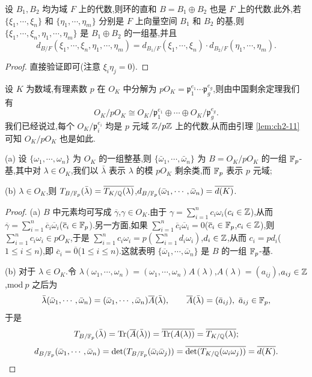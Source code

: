 \begin{lemma}\label{lem:ch2-11}
设 $B_1,B_2$ 均为域 $F$ 上的代数,则环的直和 $B=B_1\oplus B_2$ 也是 $F$ 上的代数.此外,若 $\{\xi_1,\cdots,\xi_n\}$ 和 $\{\eta_1,\cdots,\eta_m\}$ 分别是 $F$ 上向量空间 $B_1$ 和 $B_2$ 的基,则 $\{\xi_1,\cdots,\xi_n,\eta_1,\cdots,\eta_m\}$ 是 $B_1\oplus B_2$ 的一组基,并且
\begin{equation}  d_{B/F}(\xi_1,\cdots,\xi_n,\eta_1,\cdots,\eta_m)
  =d_{B_1/F}(\xi_1,\cdots,\xi_n)\cdot d_{B_2/F}(\eta_1,\cdots,\eta_m).\tag{2}\end{equation}
\end{lemma}

\begin{proof}
直接验证即可(注意 $\xi_i\eta_j=0$).
\end{proof}

设 $K$ 为数域,有理素数 $p$ 在 $O_K$ 中分解为 $pO_K=\mathfrak{p}_1^{e_1}\cdots\mathfrak{p}_g^{e_g}$,则由中国剩余定理我们有
\[
  O_K/pO_K\cong O_K/\mathfrak{p}_1^{e_1}\oplus\cdots\oplus O_K/\mathfrak{p}_g^{e_g}.
\]
我们已经说过,每个 $O_K/\mathfrak{p}_i^{e_i}$ 均是 $p$ 元域 $\mathbb{Z}/p\mathbb{Z}$ 上的代数,从而由引理 \ref{lem:ch2-11} 可知 $O_K/pO_K$ 也是如此.

\begin{lemma}\label{lem:ch2-12}
(a) 设 $\{\omega_1,\cdots,\omega_n\}$ 为 $O_K$ 的一组整基,则 $\{\bar{\omega}_1,\cdots,\bar{\omega}_n\}$ 为 $B=O_K/pO_K$ 的一组 $\mathbb{F}_p$-基,其中对 $\lambda\in O_K$,我们以 $\bar{\lambda}$ 表示 $\lambda$ 的模 $pO_K$ 剩余类,而 $\mathbb{F}_p$ 表示 $p$ 元域;

(b) $\lambda\in O_K$,则 $T_{B/\mathbb{F}_p}(\bar{\lambda})=\overline{T_{K/\mathbb{Q}}(\lambda)}$,$d_{B/\mathbb{F}_p}(\bar{\omega}_1,\cdots,\bar{\omega}_n)=\overline{d(K)}$.
\end{lemma}

\begin{proof}
(a) $B$ 中元素均可写成 $\overline{\gamma}$,$\gamma\in O_K$.由于 $\gamma=\sum_{i=1}^{n}c_i\omega_i$($c_i\in\mathbb{Z}$),从而 $\overline{\gamma}=\sum_{i=1}^{n}\overline{c}_i\overline{\omega}_i$($\overline{c}_i\in\mathbb{F}_p$).另一方面,如果 $\sum_{i=1}^{n}\overline{c}_i\overline{\omega}_i=0$($\overline{c}_i\in\mathbb{F}_p$,$c_i\in\mathbb{Z}$),则 $\sum_{i=1}^{n}c_i\omega_i\in pO_K$,于是 $\sum_{i=1}^{n}c_i\omega_i=p(\sum_{i=1}^{n}d_i\omega_i)$,$d_i\in\mathbb{Z}$,从而 $c_i=pd_i$($1\leqslant i\leqslant n$),即 $\overline{c}_i=\overline{0}$($1\leqslant i\leqslant n$).这就表明 $\{\overline{\omega}_1,\cdots,\overline{\omega}_n\}$ 是 $B$ 的一组 $\mathbb{F}_p$-基.

(b) 对于 $\lambda\in O_K$.令 $\lambda(\omega_1,\cdots,\omega_n)=(\omega_1,\cdots,\omega_n)A(\lambda)$,$A(\lambda)=(a_{ij})$,$a_{ij}\in\mathbb{Z}$,$\mathrm{mod}\ p$ 之后为
\[
  \bar{\lambda}(\bar{\omega}_1,\cdots,\bar{\omega}_n)=(\bar{\omega}_1,\cdots,\bar{\omega}_n)\overline{A}(\bar{\lambda}),
  \qquad \overline{A}(\bar{\lambda})=(\bar{a}_{ij}),\ \bar{a}_{ij}\in\F_p,
\]
于是
\[
  T_{B/\mathbb{F}_p}(\bar{\lambda})=\mathrm{Tr}(\overline{A}(\bar{\lambda}))=\overline{\mathrm{Tr}(A(\lambda))}=\overline{T_{K/\mathbb{Q}}(\lambda)};
\]
\[
  d_{B/\mathbb{F}_p}(\bar{\omega}_1,\cdots,\bar{\omega}_n)=\det(T_{B/\mathbb{F}_p}(\bar{\omega}_i\bar{\omega}_j))
  =\overline{\det(T_{K/\mathbb{Q}}(\omega_i\omega_j))}=\overline{d(K)}.
\]
\end{proof}

